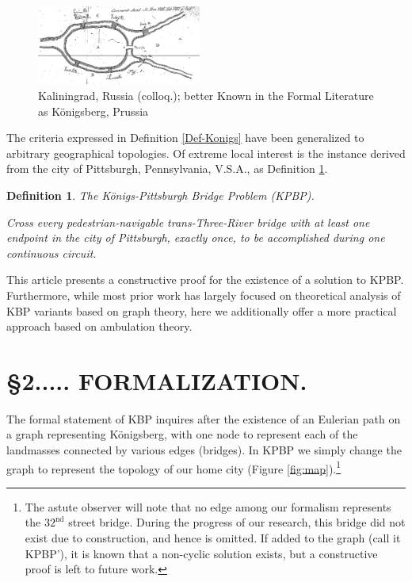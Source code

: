 \documentclass[twocolumn]{article}
\theoremstyle{plain}  %
\newtheorem{defn}{Definition}
\theoremstyle{definition}  %
\theoremstyle{remark}  %
\begin{document}
\begin{figure}[h]
\centering
	\includegraphics[width=0.48\textwidth]{koenigsburg.pdf}
	\caption{Kaliningrad, Russia (colloq.); better Known in the Formal Literature as K\"onigsberg, Prussia}
	\label{fig:koenigs}
\end{figure}

The criteria expressed in Definition \ref{Def-Konigs} have been generalized to arbitrary geographical topologies. %
Of extreme local interest is the instance derived from the city of Pittsburgh, Pennsylvania, V.S.A., as Definition \ref{Def-KonigsPgh}.

\begin{defn} \label{Def-KonigsPgh}
	The K\"onigs-Pittsburgh Bridge Problem (KPBP).

Cross every pedestrian-navigable trans-Three-River bridge with at least one endpoint in the city of Pittsburgh, exactly once, to be accomplished during one continuous circuit.
\end{defn}

This article presents a constructive proof for the existence of a solution to KPBP. Furthermore, while most prior work \cite{wikipedia} has largely focused on theoretical analysis of KBP variants based on graph theory, here we additionally offer a more practical approach based on ambulation theory.

\section*{\S 2..... FORMALIZATION.}

The formal statement of KBP inquires after the existence of an Eulerian path on a graph representing K\"onigsberg, with one node to represent each of the landmasses connected by various edges (bridges). In KPBP we simply change the graph to represent the topology of our home city (Figure \ref{fig:map}).\footnote{The astute observer will note that no edge among our formalism represents the $32^{\text{nd}}$ street bridge. During the progress of our research, this bridge did not exist due to construction, and hence is omitted. If added to the graph (call it KPBP'), it is known that a non-cyclic solution exists, but a constructive proof is left to future work.}
\end{document}
